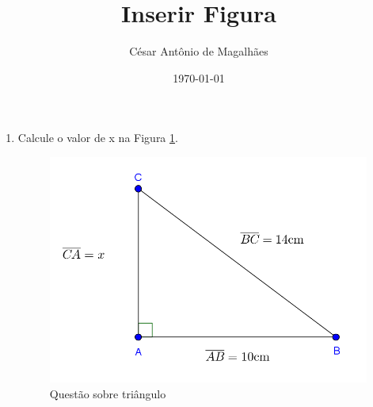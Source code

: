 \documentclass[12pt,a4paper]{article}
\title{Inserir Figura}
\author{César Antônio de Magalhães}
\date{\today}
\begin{document}
	\begin{enumerate}
		\item Calcule o valor de \textrm{x} na Figura \ref{triangulo_retangulo}.
		\begin{figure}[H]
			\centering
			\includegraphics[scale=1]{triangulo_retangulo.png}
			\caption{Questão sobre triângulo}
			\label{triangulo_retangulo}
		\end{figure}
	\end{enumerate}		
\end{document}
